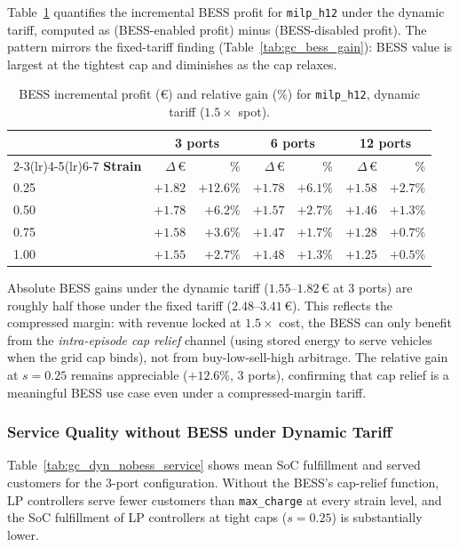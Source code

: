 Table~\ref{tab:gc_dyn_bess_gain} quantifies the incremental BESS profit for
\texttt{milp\_h12} under the dynamic tariff, computed as (BESS-enabled profit)
minus (BESS-disabled profit).  The pattern mirrors the fixed-tariff finding
(Table~\ref{tab:gc_bess_gain}): BESS value is largest at the tightest cap and
diminishes as the cap relaxes.

\begin{table}[!htb]
\centering
\caption{BESS incremental profit (€) and relative gain (\%) for
         \texttt{milp\_h12}, dynamic tariff ($1.5\times$ spot).}
\label{tab:gc_dyn_bess_gain}
\begin{tabular}{l rr rr rr}
\toprule
 & \multicolumn{2}{c}{\textbf{3 ports}}
 & \multicolumn{2}{c}{\textbf{6 ports}}
 & \multicolumn{2}{c}{\textbf{12 ports}} \\
\cmidrule(lr){2-3}\cmidrule(lr){4-5}\cmidrule(lr){6-7}
\textbf{Strain} & $\Delta$\,€ & \% & $\Delta$\,€ & \% & $\Delta$\,€ & \% \\
\midrule
0.25 & $+1.82$ & $+12.6\%$ & $+1.78$ & $+6.1\%$ & $+1.58$ & $+2.7\%$ \\
0.50 & $+1.78$ & $+6.2\%$  & $+1.57$ & $+2.7\%$ & $+1.46$ & $+1.3\%$ \\
0.75 & $+1.58$ & $+3.6\%$  & $+1.47$ & $+1.7\%$ & $+1.28$ & $+0.7\%$ \\
1.00 & $+1.55$ & $+2.7\%$  & $+1.48$ & $+1.3\%$ & $+1.25$ & $+0.5\%$ \\
\bottomrule
\end{tabular}
\end{table}

Absolute BESS gains under the dynamic tariff ($1.55$--$1.82$\,€ at 3 ports)
are roughly half those under the fixed tariff ($2.48$--$3.41$\,€).  This
reflects the compressed margin: with revenue locked at $1.5\times$ cost, the
BESS can only benefit from the \emph{intra-episode cap relief} channel (using
stored energy to serve vehicles when the grid cap binds), not from
buy-low-sell-high arbitrage.  The relative gain at $s=0.25$ remains
appreciable ($+12.6\%$, 3 ports), confirming that cap relief is a
meaningful BESS use case even under a compressed-margin tariff.

\subsubsection{Service Quality without BESS under Dynamic Tariff}
\label{subsubsec:gc_dyn_nobess_service}

Table~\ref{tab:gc_dyn_nobess_service} shows mean SoC fulfillment and served
customers for the 3-port configuration.  Without the BESS's cap-relief
function, LP controllers serve fewer customers than \texttt{max\_charge}
at every strain level, and the SoC fulfillment of LP controllers at tight
caps ($s=0.25$) is substantially lower.

